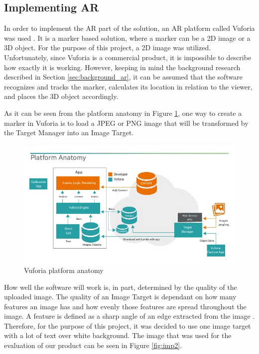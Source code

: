 \subsection{Implementing AR}
In order to implement the AR part of the solution, an AR platform called Vuforia was used  \cite{Vuforia}. It is a marker based solution, where a marker can be a 2D image or a 3D object. For the purpose of this project, a 2D image was utilized. Unfortunately, since Vuforia is a commercial product, it is impossible to describe how exactly it is working. However, keeping in mind the background research described in Section \ref{sec:background_ar}, it can be assumed that the software recognizes and tracks the marker, calculates its location in relation to the viewer, and places the 3D object accordingly. 

As it can be seen from the platform anatomy in Figure \ref{fig:imp1}, one way to create a marker in Vuforia is to load a JPEG or PNG image that will be transformed by the Target Manager into an Image Target. 

\begin{figure}[h!]
    \centering
    \includegraphics[width=\textwidth]{figures/imp1.jpg}
    \caption{Vuforia platform anatomy \cite{getting_started}}\label{fig:imp1}
\end{figure}

How well the software will  work is, in part, determined by the quality of the uploaded image. The quality of an Image Target is dependant on how many features an image has and how evenly those features are spread throughout the image. A feature is defined as a sharp angle of an edge extracted from the image \cite{Natural_features}. Therefore, for the purpose of this project, it was decided to use one image target with a lot of text over white background. The image that was used for the evaluation of our product can be seen in Figure \ref{fig:imp2}. 

